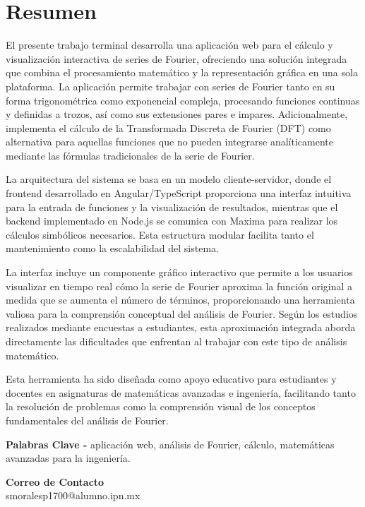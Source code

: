 \chapter{Resumen}
El presente trabajo terminal desarrolla una aplicación web para el cálculo y visualización interactiva de series de Fourier, ofreciendo una solución integrada que combina el procesamiento matemático y la representación gráfica en una sola plataforma. La aplicación permite trabajar con series de Fourier tanto en su forma trigonométrica como exponencial compleja, procesando funciones continuas y definidas a trozos, así como sus extensiones pares e impares. Adicionalmente, implementa el cálculo de la Transformada Discreta de Fourier (DFT) como alternativa para aquellas funciones que no pueden integrarse analíticamente mediante las fórmulas tradicionales de la serie de Fourier.

La arquitectura del sistema se basa en un modelo cliente-servidor, donde el frontend desarrollado en Angular/TypeScript proporciona una interfaz intuitiva para la entrada de funciones y la visualización de resultados, mientras que el backend implementado en Node.js se comunica con Maxima para realizar los cálculos simbólicos necesarios. Esta estructura modular facilita tanto el mantenimiento como la escalabilidad del sistema.

La interfaz incluye un componente gráfico interactivo que permite a los usuarios visualizar en tiempo real cómo la serie de Fourier aproxima la función original a medida que se aumenta el número de términos, proporcionando una herramienta valiosa para la comprensión conceptual del análisis de Fourier. Según los estudios realizados mediante encuestas a estudiantes, esta aproximación integrada aborda directamente las dificultades que enfrentan al trabajar con este tipo de análisis matemático.

Esta herramienta ha sido diseñada como apoyo educativo para estudiantes y docentes en asignaturas de matemáticas avanzadas e ingeniería, facilitando tanto la resolución de problemas como la comprensión visual de los conceptos fundamentales del análisis de Fourier.



\vspace{0.5cm}

\textbf{Palabras Clave -} aplicación web, análisis de Fourier, cálculo, matemáticas avanzadas para la ingeniería.

\vspace{0.5cm}

\textbf{Correo de Contacto} \\
smoralesp1700@alumno.ipn.mx \\